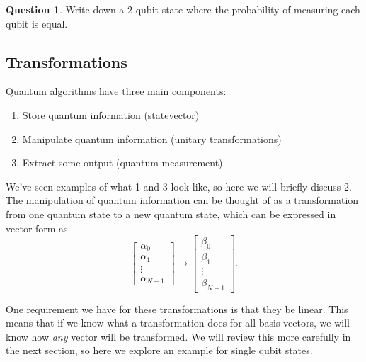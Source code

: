 \documentclass[letterpaper, 12pt]{article}
\newcommand{\1}{\mathds{1}}	%
\theoremstyle{definition}
\newtheorem{question}{Question}
\begin{document}
\begin{question}
    Write down a 2-qubit state where the probability of measuring each qubit is equal. 
\end{question}
\newpage 

\subsection{Transformations}

Quantum algorithms have three main components: 
\begin{enumerate}
    \item Store quantum information (statevector)
    \item Manipulate quantum information (unitary transformations)
    \item Extract some output (quantum measurement)
\end{enumerate}

We've seen examples of what 1 and 3 look like, so here we will briefly discuss 2. The manipulation of quantum information can be thought of as a transformation from one quantum state to a new quantum state, which can be expressed in vector form as 
\begin{equation}
    \begin{bmatrix}
        \alpha_0 \\ \alpha_1 \\ \vdots \\ \alpha_{N-1}
    \end{bmatrix} \rightarrow \begin{bmatrix}
        \beta_0 \\ \beta_1 \\ \vdots \\ \beta_{N-1}
    \end{bmatrix}.
\end{equation}

One requirement we have for these transformations is that they be linear. This means that if we know what a transformation does for all basis vectors, we will know how \textit{any} vector will be transformed. We will review this more carefully in the next section, so here we explore an example for single qubit states. 
\end{document}
